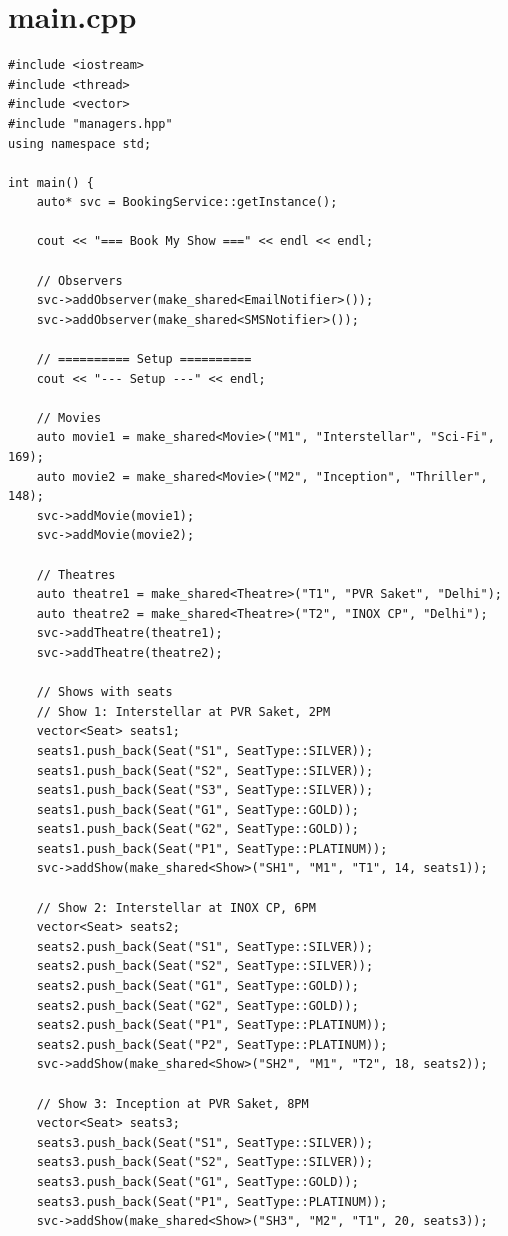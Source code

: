 \documentclass[11pt,a4paper]{article}
\begin{document}
\newpage
\section{main.cpp}
\begin{lstlisting}[title={\texttt{main.cpp}}]
#include <iostream>
#include <thread>
#include <vector>
#include "managers.hpp"
using namespace std;

int main() {
    auto* svc = BookingService::getInstance();

    cout << "=== Book My Show ===" << endl << endl;

    // Observers
    svc->addObserver(make_shared<EmailNotifier>());
    svc->addObserver(make_shared<SMSNotifier>());

    // ========== Setup ==========
    cout << "--- Setup ---" << endl;

    // Movies
    auto movie1 = make_shared<Movie>("M1", "Interstellar", "Sci-Fi", 169);
    auto movie2 = make_shared<Movie>("M2", "Inception", "Thriller", 148);
    svc->addMovie(movie1);
    svc->addMovie(movie2);

    // Theatres
    auto theatre1 = make_shared<Theatre>("T1", "PVR Saket", "Delhi");
    auto theatre2 = make_shared<Theatre>("T2", "INOX CP", "Delhi");
    svc->addTheatre(theatre1);
    svc->addTheatre(theatre2);

    // Shows with seats
    // Show 1: Interstellar at PVR Saket, 2PM
    vector<Seat> seats1;
    seats1.push_back(Seat("S1", SeatType::SILVER));
    seats1.push_back(Seat("S2", SeatType::SILVER));
    seats1.push_back(Seat("S3", SeatType::SILVER));
    seats1.push_back(Seat("G1", SeatType::GOLD));
    seats1.push_back(Seat("G2", SeatType::GOLD));
    seats1.push_back(Seat("P1", SeatType::PLATINUM));
    svc->addShow(make_shared<Show>("SH1", "M1", "T1", 14, seats1));

    // Show 2: Interstellar at INOX CP, 6PM
    vector<Seat> seats2;
    seats2.push_back(Seat("S1", SeatType::SILVER));
    seats2.push_back(Seat("S2", SeatType::SILVER));
    seats2.push_back(Seat("G1", SeatType::GOLD));
    seats2.push_back(Seat("G2", SeatType::GOLD));
    seats2.push_back(Seat("P1", SeatType::PLATINUM));
    seats2.push_back(Seat("P2", SeatType::PLATINUM));
    svc->addShow(make_shared<Show>("SH2", "M1", "T2", 18, seats2));

    // Show 3: Inception at PVR Saket, 8PM
    vector<Seat> seats3;
    seats3.push_back(Seat("S1", SeatType::SILVER));
    seats3.push_back(Seat("S2", SeatType::SILVER));
    seats3.push_back(Seat("G1", SeatType::GOLD));
    seats3.push_back(Seat("P1", SeatType::PLATINUM));
    svc->addShow(make_shared<Show>("SH3", "M2", "T1", 20, seats3));


\end{lstlisting}
\end{document}
